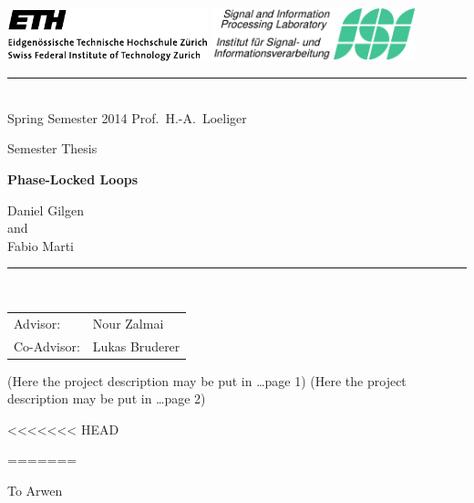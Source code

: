 \documentclass[11pt,a4paper,twoside]{report}
\begin{document}
\pagestyle{plain}

\begin{titlepage}
  \begin{center}
    \includegraphics[height=15mm]{gfx/ethlogo} \hfill
    \includegraphics[height=15.5mm]{gfx/isilogo_left}
    \rule{\textwidth}{0.5pt}\\[1ex]
    {\Large Spring Semester 2014 \hfill 
      Prof.~H.-A.~Loeliger
    }

    \LARGE Semester Thesis

    \Huge\textbf{
      Phase-Locked Loops
    }
    
    \LARGE{
      Daniel Gilgen\\
      and \\
      Fabio Marti \\
    }
    
  \end{center}
  \rule{\textwidth}{0.5pt}\\[2ex]
  \noindent
  \begin{tabular}{@{}ll@{}}
    \Large Advisor: & \Large Nour Zalmai\\[1ex]
    \Large Co-Advisor: & \Large Lukas Bruderer
  \end{tabular}
\end{titlepage}

\cleardoublepage
(Here the project description may be put in \ldots page 1)
\clearpage
(Here the project description may be put in \ldots page 2)
\cleardoublepage

<<<<<<< HEAD

=======
\thispagestyle{empty}
\bigskip
\begin{center}   
  To Arwen
\end{center}
\end{document}
